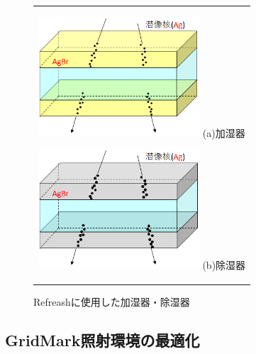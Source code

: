 \documentclass[12pt,a4paper]{jarticle}
\begin{document}
\begin{figure}[htbp]
  \centering
      \begin{tabular}{c}
        \begin{minipage}{0.5\hsize}
          \centering
            \includegraphics[clip, width=60mm]{process_bdev.png}
            \hspace{1.6cm} (a)加湿器
        \end{minipage}
        
        \begin{minipage}{0.5\hsize}
          \centering
            \includegraphics[clip, width=60mm]{process_adev.png}
            \hspace{1.6cm} (b)除湿器
        \end{minipage}
    
      \end{tabular}
      \caption{Refreashに使用した加湿器・除湿器\label{fig:refresh_mizumasi-nn}}
\end{figure}
\subsection{GridMark照射環境の最適化}
\end{document}
